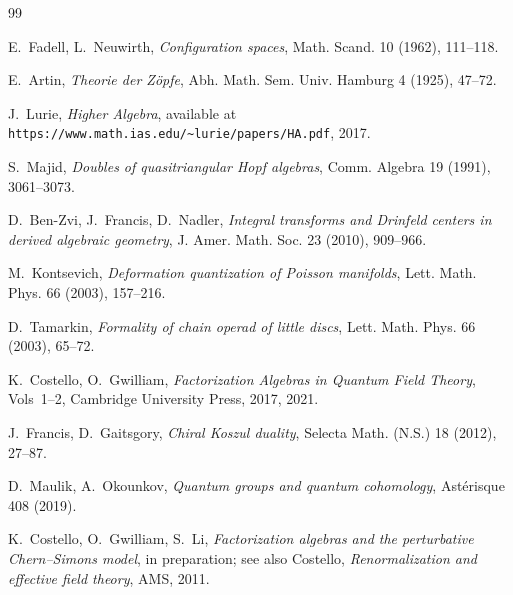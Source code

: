 \documentclass[11pt]{article}
\theoremstyle{definition}
\theoremstyle{remark}
\begin{document}
\begin{thebibliography}{99}

E.~Fadell, L.~Neuwirth,
\emph{Configuration spaces},
Math. Scand. 10 (1962), 111--118.

E.~Artin,
\emph{Theorie der Z\"opfe},
Abh. Math. Sem. Univ. Hamburg 4 (1925), 47--72.

J.~Lurie,
\emph{Higher Algebra},
available at
\texttt{https://www.math.ias.edu/\~{}lurie/papers/HA.pdf},
2017.

S.~Majid,
\emph{Doubles of quasitriangular Hopf algebras},
Comm. Algebra 19 (1991), 3061--3073.

D.~Ben-Zvi, J.~Francis, D.~Nadler,
\emph{Integral transforms and Drinfeld centers in derived algebraic geometry},
J. Amer. Math. Soc. 23 (2010), 909--966.

M.~Kontsevich,
\emph{Deformation quantization of Poisson manifolds},
Lett. Math. Phys. 66 (2003), 157--216.

D.~Tamarkin,
\emph{Formality of chain operad of little discs},
Lett. Math. Phys. 66 (2003), 65--72.

K.~Costello, O.~Gwilliam,
\emph{Factorization Algebras in Quantum Field Theory}, Vols~1--2,
Cambridge University Press, 2017, 2021.

J.~Francis, D.~Gaitsgory,
\emph{Chiral Koszul duality},
Selecta Math. (N.S.) 18 (2012), 27--87.

D.~Maulik, A.~Okounkov,
\emph{Quantum groups and quantum cohomology},
Ast\'erisque 408 (2019).

K.~Costello, O.~Gwilliam, S.~Li,
\emph{Factorization algebras and the perturbative Chern--Simons
model},
in preparation; see also Costello, \emph{Renormalization and
effective field theory}, AMS, 2011.

\end{thebibliography}
\end{document}
